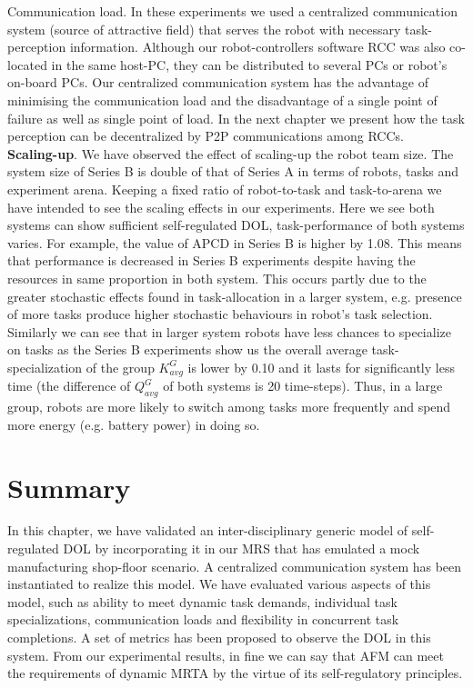 {Communication load.} In these experiments we used a centralized communication system (source of attractive field) that serves the robot with necessary task-perception information. Although our robot-controllers software RCC was also co-located in the same host-PC, they can be distributed to several PCs or robot's on-board PCs. Our centralized communication system has the advantage of minimising the communication load and the disadvantage of a single point of failure as well as single point of load. In the next chapter we present how the task perception can be decentralized by P2P communications among RCCs.\\
\textbf{Scaling-up}. We have observed the effect of scaling-up the robot team size. The system size of Series B is double of that of Series A in terms of robots, tasks and experiment arena. Keeping a fixed ratio of robot-to-task and task-to-arena we have intended to see the scaling effects in our experiments. Here we see both systems can show sufficient self-regulated DOL, task-performance of both systems varies. For example, the value of APCD in Series B is higher by 1.08. This means that performance  is decreased in Series B experiments despite having the resources in same proportion in both system. This occurs partly due to the greater stochastic effects found in task-allocation in a larger system, e.g. presence of more tasks produce higher stochastic behaviours in robot's task selection.\\
Similarly we can see that in larger system robots have less chances to specialize on tasks as the Series B experiments show us the overall average task-specialization of the group $K^G_{avg}$ is lower by 0.10 and it lasts for significantly less time (the difference of $Q^G_{avg}$  of both systems is 20 time-steps). Thus, in a large group, robots are more likely to switch among tasks more frequently and spend more energy (e.g. battery power) in doing so.
\section{Summary}
\label{afm:summary}
In this chapter, we have validated an inter-disciplinary generic model of self-regulated DOL by incorporating it in our MRS that has emulated a mock manufacturing shop-floor scenario. A centralized communication system has been instantiated to realize this model. We have evaluated various aspects of this model, such as ability to meet dynamic task demands, individual task specializations, communication loads and flexibility in concurrent task completions. A set of metrics has been proposed to observe the DOL in this system. From our experimental results, in fine we can say that AFM can meet the requirements of dynamic MRTA by the virtue of its self-regulatory principles.
